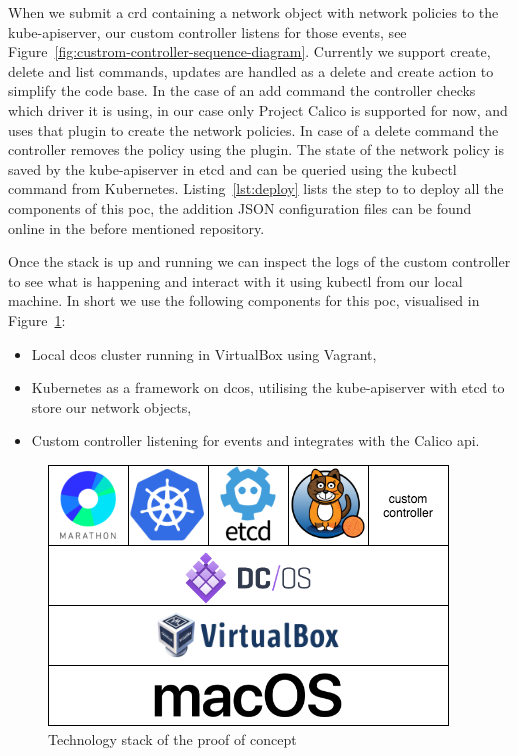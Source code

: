 When we submit a \gls{crd} containing a network object with network policies to the kube-apiserver, our custom controller listens for those events, see Figure~\ref{fig:custrom-controller-sequence-diagram}. Currently we support create, delete and list commands, updates are handled as a delete and create action to simplify the code base. In the case of an add command the controller checks which driver it is using, in our case only Project Calico is supported for now, and uses that plugin to create the network policies. In case of a delete command the controller removes the policy using the plugin. The state of the network policy is saved by the kube-apiserver in etcd and can be queried using the kubectl command from Kubernetes. Listing~\ref{lst:deploy} lists the step to to deploy all the components of this \gls{poc}, the addition JSON configuration files can be found online in the before mentioned repository. 

Once the stack is up and running we can inspect the logs of the custom controller to see what is happening and interact with it using kubectl from our local machine. In short we use the following components for this \gls{poc}, visualised in Figure~\ref{fig:poc-stack}:
\begin{itemize}
    \item Local \gls{dcos} cluster running in VirtualBox\cite{virtualbox} using Vagrant\cite{vagrant},
    \item Kubernetes as a framework on \gls{dcos}, utilising the kube-apiserver with etcd to store our network objects,
    \item Custom controller listening for events and integrates with the Calico \gls{api}.
\end{itemize}


\begin{figure}
    \centering
    \includegraphics[width=0.6\columnwidth]{images/poc-stack}
    \caption{Technology stack of the proof of concept}
    \label{fig:poc-stack}
\end{figure}
